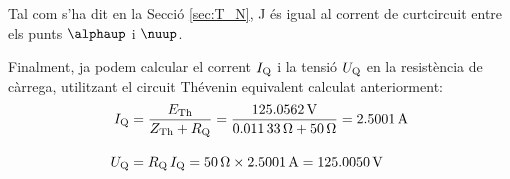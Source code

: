\begin{exemple}
    Tal com s'ha dit en la Secci\'{o} \ref{sec:T_N}, J \'{e}s igual al
    corrent de curtcircuit entre els punts $\alphaup$ i $\nuup$.

    Finalment, ja podem calcular el corrent $I_\mathrm{Q}$ i la tensi\'{o} $U_\mathrm{Q}$ en la
    resist\`{e}ncia de c\`{a}rrega, utilitzant el circuit Th\'{e}venin equivalent calculat anteriorment:
    \begin{align*}
        I_\mathrm{Q} &= \frac{E_\mathrm{Th}}{Z_\mathrm{Th} + R_\mathrm{Q}} = \frac{\SI{125,0562}{V}}
        {\SI{0,01133}{\ensuremath{\mathrm{\Omega}}} + \SI{50}{\ensuremath{\mathrm{\Omega}}}} = \SI{2,5001}{A} \\[2ex]
        U_\mathrm{Q} &=  R_\mathrm{Q} \,I_\mathrm{Q} = \SI{50}{\ensuremath{\mathrm{\Omega}}} \times \SI{2,5001}{A} =
        \SI{125,0050}{V}
    \end{align*}
\end{exemple}


